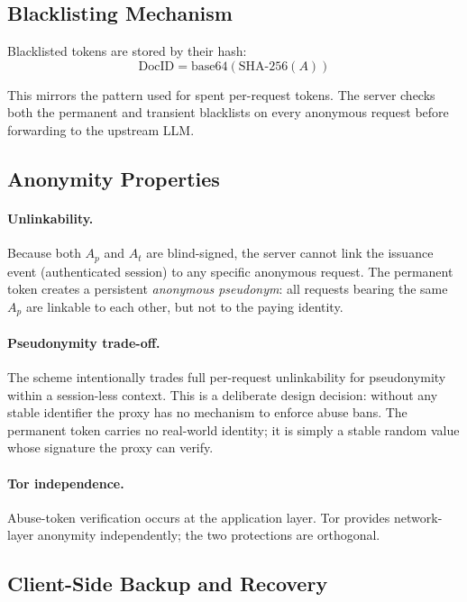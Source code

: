 \documentclass[11pt,a4paper]{article}
\begin{document}
\subsection{Blacklisting Mechanism}

Blacklisted tokens are stored by their hash:
\[
  \text{DocID} = \mathrm{base64}\!\left(\mathrm{SHA\text{-}256}(A)\right)
\]

This mirrors the pattern used for spent per-request tokens. The server checks both the permanent and
transient blacklists on every anonymous request before forwarding to the upstream LLM.

\subsection{Anonymity Properties}

\paragraph{Unlinkability.}
Because both $A_p$ and $A_t$ are blind-signed, the server cannot link the issuance event (authenticated
session) to any specific anonymous request. The permanent token creates a persistent \emph{anonymous
pseudonym}: all requests bearing the same $A_p$ are linkable to each other, but not to the paying
identity.

\paragraph{Pseudonymity trade-off.}
The scheme intentionally trades full per-request unlinkability for pseudonymity within a session-less
context. This is a deliberate design decision: without any stable identifier the proxy has no mechanism to
enforce abuse bans. The permanent token carries no real-world identity; it is simply a stable random
value whose signature the proxy can verify.

\paragraph{Tor independence.}
Abuse-token verification occurs at the application layer. Tor provides network-layer anonymity
independently; the two protections are orthogonal.

\subsection{Client-Side Backup and Recovery}
\end{document}

